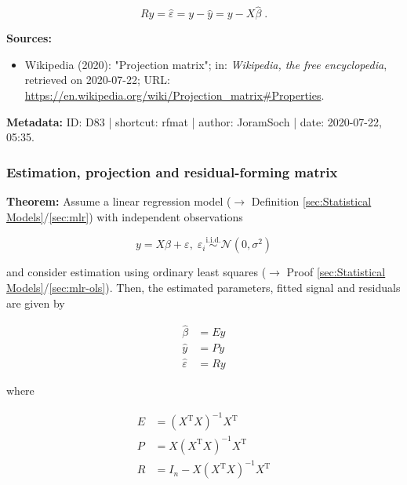 \documentclass[a4paper,12pt,twoside]{book}
\begin{document}
\begin{equation} \label{eq:rfmat-pm}
Ry = \hat{\varepsilon} = y - \hat{y} = y - X \hat{\beta} \; .
\end{equation}


\vspace{1em}
\textbf{Sources:}
\begin{itemize}
\item Wikipedia (2020): "Projection matrix"; in: \textit{Wikipedia, the free encyclopedia}, retrieved on 2020-07-22; URL: \url{https://en.wikipedia.org/wiki/Projection_matrix#Properties}.
\end{itemize}


\vspace{1em}
\textbf{Metadata:} ID: D83 | shortcut: rfmat | author: JoramSoch | date: 2020-07-22, 05:35.
\vspace{1em}



\subsubsection[\textbf{Estimation, projection and residual-forming matrix}]{Estimation, projection and residual-forming matrix} \label{sec:mlr-mat}
\setcounter{equation}{0}

\textbf{Theorem:} Assume a linear regression model ($\rightarrow$ Definition \ref{sec:Statistical Models}/\ref{sec:mlr}) with independent observations

\begin{equation} \label{eq:mlr-mat-mlr}
y = X\beta + \varepsilon, \; \varepsilon_i \overset{\mathrm{i.i.d.}}{\sim} \mathcal{N}(0, \sigma^2)
\end{equation}

and consider estimation using ordinary least squares ($\rightarrow$ Proof \ref{sec:Statistical Models}/\ref{sec:mlr-ols}). Then, the estimated parameters, fitted signal and residuals are given by

\begin{equation} \label{eq:mlr-mat-mlr-est}
\begin{split}
\hat{\beta} &= E y \\
\hat{y} &= P y \\
\hat{\varepsilon} &= R y
\end{split}
\end{equation}

where 

\begin{equation} \label{eq:mlr-mat-mlr-mat}
\begin{split}
E &= (X^\mathrm{T} X)^{-1} X^\mathrm{T} \\
P &= X (X^\mathrm{T} X)^{-1} X^\mathrm{T} \\
R &= I_n - X (X^\mathrm{T} X)^{-1} X^\mathrm{T}
\end{split}
\end{equation}
\end{document}
